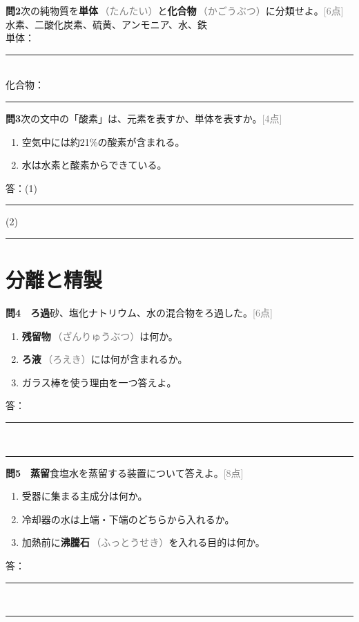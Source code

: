 \documentclass[11pt,a4paper]{ctexart}
\newcommand{\vocab}[2]{\textcolor{JapanBlue}{\textbf{#1}}\,\textcolor{gray}{\footnotesize（#2）}}
\newcommand{\blank}[1]{\rule{#1}{0.4pt}}
\newcommand{\score}[1]{\hfill\textcolor{gray}{[#1点]}}
\newenvironment{qbox}{\begin{list}{}{\setlength{\leftmargin}{0pt}}\item\begin{minipage}{\linewidth}}{\end{minipage}\end{list}\vspace{3mm}}
\begin{document}
\begin{qbox}\textbf{問2}\quad 次の純物質を\vocab{単体}{たんたい}と\vocab{化合物}{かごうぶつ}に分類せよ。\score{6}\\
水素、二酸化炭素、硫黄、アンモニア、水、鉄\\[2mm]
単体：\blank{95mm}\\[2mm]化合物：\blank{95mm}\end{qbox}

\begin{qbox}\textbf{問3}\quad 次の文中の「酸素」は、元素を表すか、単体を表すか。\score{4}
\begin{enumerate}[label=(\arabic*),leftmargin=9mm]\item 空気中には約21\%の酸素が含まれる。\item 水は水素と酸素からできている。\end{enumerate}
答：(1)\blank{30mm}\quad (2)\blank{30mm}\end{qbox}

\section{分離と精製}
\begin{qbox}\textbf{問4　ろ過}\quad 砂、塩化ナトリウム、水の混合物をろ過した。\score{6}
\begin{enumerate}[label=(\arabic*),leftmargin=9mm]\item \vocab{残留物}{ざんりゅうぶつ}は何か。\item \vocab{ろ液}{ろえき}には何が含まれるか。\item ガラス棒を使う理由を一つ答えよ。\end{enumerate}
答：\blank{150mm}\\[3mm]\blank{150mm}\end{qbox}

\begin{qbox}\textbf{問5　蒸留}\quad 食塩水を蒸留する装置について答えよ。\score{8}
\begin{enumerate}[label=(\arabic*),leftmargin=9mm]\item 受器に集まる主成分は何か。\item 冷却器の水は上端・下端のどちらから入れるか。\item 加熱前に\vocab{沸騰石}{ふっとうせき}を入れる目的は何か。\end{enumerate}
答：\blank{150mm}\\[3mm]\blank{150mm}\end{qbox}
\end{document}
